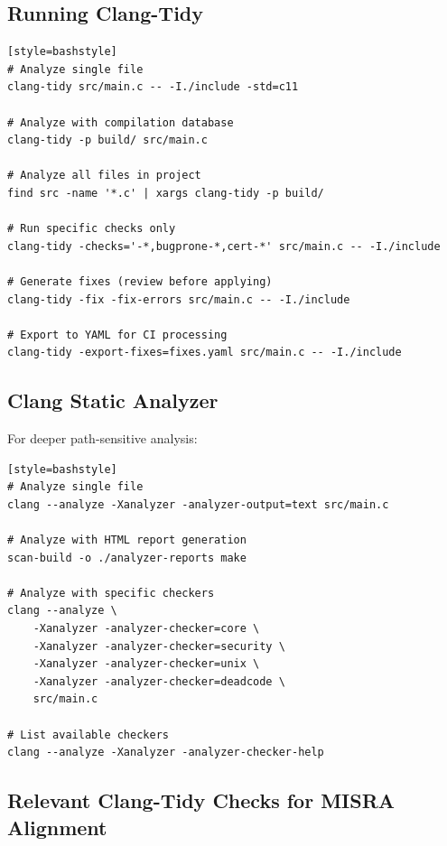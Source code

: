 \documentclass[11pt,letterpaper]{report}
\begin{document}
\subsection{Running Clang-Tidy}

\begin{verbatim}[style=bashstyle]
# Analyze single file
clang-tidy src/main.c -- -I./include -std=c11

# Analyze with compilation database
clang-tidy -p build/ src/main.c

# Analyze all files in project
find src -name '*.c' | xargs clang-tidy -p build/

# Run specific checks only
clang-tidy -checks='-*,bugprone-*,cert-*' src/main.c -- -I./include

# Generate fixes (review before applying)
clang-tidy -fix -fix-errors src/main.c -- -I./include

# Export to YAML for CI processing
clang-tidy -export-fixes=fixes.yaml src/main.c -- -I./include
\end{verbatim}

\subsection{Clang Static Analyzer}

For deeper path-sensitive analysis:

\begin{verbatim}[style=bashstyle]
# Analyze single file
clang --analyze -Xanalyzer -analyzer-output=text src/main.c

# Analyze with HTML report generation
scan-build -o ./analyzer-reports make

# Analyze with specific checkers
clang --analyze \
    -Xanalyzer -analyzer-checker=core \
    -Xanalyzer -analyzer-checker=security \
    -Xanalyzer -analyzer-checker=unix \
    -Xanalyzer -analyzer-checker=deadcode \
    src/main.c

# List available checkers
clang --analyze -Xanalyzer -analyzer-checker-help
\end{verbatim}

\subsection{Relevant Clang-Tidy Checks for MISRA Alignment}
\end{document}

